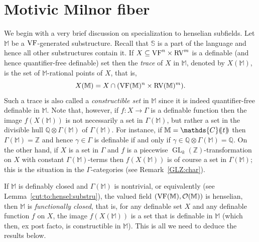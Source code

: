 \documentclass[12pt]{amsart}
\newcommand{\memph}[1]{{\color{magenta}\emph{#1}}}
\theoremstyle{plain}
\theoremstyle{definition}
\theoremstyle{remark}
\newtheorem{rem}[thm]{Remark}
\numberwithin{equation}{section}
\theoremstyle{plain}
\newcommand{\VF}{\textup{VF}}
\newcommand{\RV}{\textup{RV}}
\newcommand{\OO}{\mdl O}
\DeclareMathOperator{\mgl}{GL}
\newcommand{\Z}{\mathds{Z}}
\newcommand{\C}{\mathds{C}}
\newcommand{\Q}{\mathds{Q}}
\newcommand{\0}{\emptyset}
\newcommand{\dpar}[1]{%
   (\mkern-4mu (#1 )\mkern-4mu )}
\newcommand{\mdl}[1]{\mathcal{#1}}  %
\newcommand{\bb}[1]{\mathbb{#1}}
\newcommand{\fun}{\longrightarrow}
\newcommand{\sub}{\subseteq}
\begin{document}
\section{Motivic Milnor fiber}\label{sec:spec:pui}

We begin with a very brief discussion on specialization to henselian subfields. Let $\mathbb{M}$ be a $\VF$-generated  substructure. Recall that $\mathbb{S}$ is a part of the language and hence all other substructures contain it. If $X \sub \VF^n  \times \RV^m$ is a definable (and hence quantifier-free definable) set then the \memph{trace} of $X$ in $\mathbb{M}$, denoted by $X(\mathbb{M})$, is the set of $\mathbb{M}$-rational points of $X$, that is,
\[
X(\mathbb{M}) = X \cap (\VF(\mathbb{M})^n  \times \RV(\mathbb{M})^m).
\]
Such a trace is also called a \memph{constructible set} in $\mathbb{M}$ since it is indeed quantifier-free definable in $\mathbb{M}$. Note that, however, if $f : X \fun \Gamma$ is a definable function then the image $f(X(\mathbb{M}))$  is not necessarily a set in $\Gamma(\mathbb{M})$, but rather a set in the divisible hull $\Q \otimes \Gamma(\mathbb{M})$  of $\Gamma(\mathbb{M})$. For instance, if $\mathbb{M} = \C \dpar t$ then $\Gamma(\mathbb{M}) = \Z$ and hence $\gamma \in \Gamma$ is definable if and only if $\gamma \in \Q \otimes \Gamma(\mathbb{M}) = \Q$. On the other hand, if $X$ is a set in $\Gamma$ and $f$ is a piecewise $\mgl_k(\Z)$-transformation on $X$ with constant $\Gamma(\mathbb{M})$-terms  then $f(X(\mathbb{M}))$ is of course a set in $\Gamma(\mathbb{M})$; this is the situation in the $\Gamma$-categories (see Remark~\ref{GLZ:char}).




If $\mathbb{M}$ is definably closed and $\Gamma(\mathbb{M})$ is nontrivial, or equivalently (see Lemma~\ref{cut:to:hensel:substru}), the valued field $(\VF(\mathbb{M}), \OO(\mathbb{M}))$  is henselian, then $\mathbb{M}$ is \memph{functionally closed}, that is,  for any definable set $X$ and any definable function $f$ on $X$, the image $f(X(\mathbb{M}))$ is a set that is definable in $\mathbb{M}$ (which then, ex post facto, is  constructible in $\bb M$). This is all we need to deduce the results below.
\end{document}
